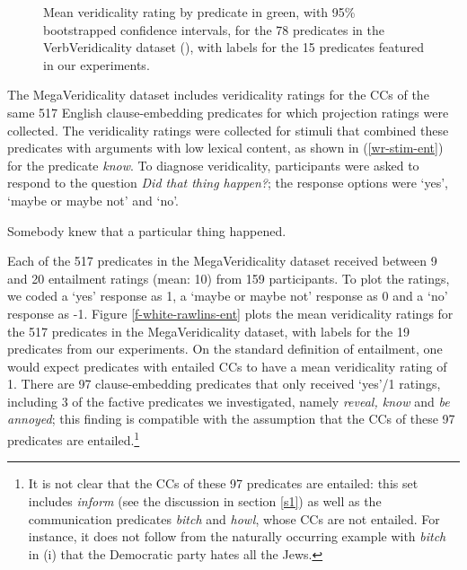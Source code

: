 \documentclass[11pt,fleqn]{article}
\newcommand{\6}{\mbox{$[\hspace*{-.6mm}[$}}
\newcommand{\9}{\mbox{$]\hspace*{-.6mm}]$}}
\begin{document}
{\begin{figure}[H]
\caption{Mean veridicality rating by predicate in green, with 95\% bootstrapped confidence intervals, for the 78 predicates in the VerbVeridicality dataset (\citealt{ross-pavlick2019}), with labels for the 15 predicates featured in our experiments.}
\label{f-vv-projectivity}
\end{figure}

The MegaVeridicality dataset includes veridicality ratings for the CCs of the same 517 English clause-embedding predicates for which projection ratings were collected. The veridicality ratings were collected for stimuli that combined these predicates with arguments with low lexical content, as shown in (\ref{wr-stim-ent}) for the predicate {\em know}. To diagnose veridicality, participants were asked to respond to the question {\em Did that thing happen?}; the response options were `yes', `maybe or maybe not' and `no'. 

\begin{exe}
\ex\label{wr-stim-ent} Somebody knew that a particular thing happened.
\end{exe}

Each of the 517 predicates in the MegaVeridicality dataset received between 9 and 20 entailment ratings (mean: 10) from 159 participants. To plot the ratings, we coded a `yes' response as 1, a `maybe or maybe not' response as 0 and a `no' response as -1. Figure \ref{f-white-rawlins-ent} plots the mean veridicality ratings for the 517 predicates in the MegaVeridicality dataset, with labels for the 19 predicates from our experiments. On the standard definition of entailment, one would expect predicates with entailed CCs to have a mean veridicality rating of 1. There are 97 clause-embedding predicates that only received `yes'/1 ratings, including 3 of the factive predicates we investigated, namely {\em reveal, know} and {\em be annoyed}; this finding is compatible with the assumption that the CCs of these 97 predicates are entailed.\footnote{\label{mv}It is not clear that the CCs of these 97 predicates are entailed: this set includes {\em inform} (see the discussion in section \ref{s1}) as well as the communication predicates {\em bitch} and {\em howl}, whose CCs are not entailed. For instance, it does not follow from the naturally occurring example with {\em bitch} in (i) that the Democratic party hates all the Jews.

}}
\end{document}
